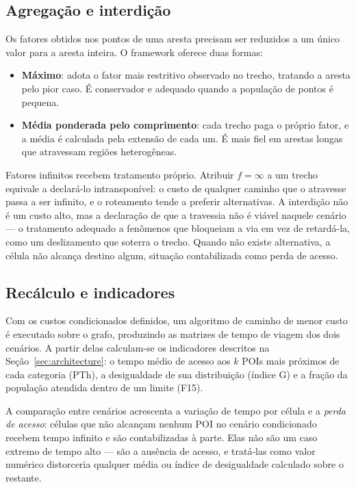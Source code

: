 \subsection{Agregação e interdição}

Os fatores obtidos nos pontos de uma aresta precisam ser reduzidos a um único
valor para a aresta inteira. O framework oferece duas formas:

\begin{itemize}
  \item \textbf{Máximo}: adota o fator mais restritivo observado no trecho,
    tratando a aresta pelo pior caso. É conservador e adequado quando a
    população de pontos é pequena.
  \item \textbf{Média ponderada pelo comprimento}: cada trecho paga o próprio
    fator, e a média é calculada pela extensão de cada um. É mais fiel em
    arestas longas que atravessam regiões heterogêneas.
\end{itemize}

Fatores infinitos recebem tratamento próprio. Atribuir $f = \infty$ a um trecho equivale a declará-lo intransponível: o custo de qualquer caminho que o atravesse passa a ser infinito, e o roteamento tende a preferir alternativas. A interdição não é um custo alto, mas a declaração de que a travessia não é viável naquele cenário — o tratamento adequado a fenômenos que bloqueiam a via em vez de retardá-la, como um deslizamento que soterra o trecho. Quando não existe alternativa, a célula não alcança destino algum, situação contabilizada como perda de acesso.

\subsection{Recálculo e indicadores}

Com os custos condicionados definidos, um algoritmo de caminho de menor custo é
executado sobre o grafo, produzindo as matrizes de tempo de viagem dos dois
cenários. A partir delas calculam-se os indicadores descritos na
Seção~\ref{sec:architecture}: o tempo médio de acesso aos $k$ POIs mais próximos
de cada categoria (PTh), a desigualdade de sua distribuição (índice G) e a fração
da população atendida dentro de um limite (F15).

A comparação entre cenários acrescenta a variação de tempo por célula e a
\emph{perda de acesso}: células que não alcançam nenhum POI no cenário
condicionado recebem tempo infinito e são contabilizadas à parte. Elas não são um
caso extremo de tempo alto — são a ausência de acesso, e tratá-las como valor
numérico distorceria qualquer média ou índice de desigualdade calculado sobre o
restante.
